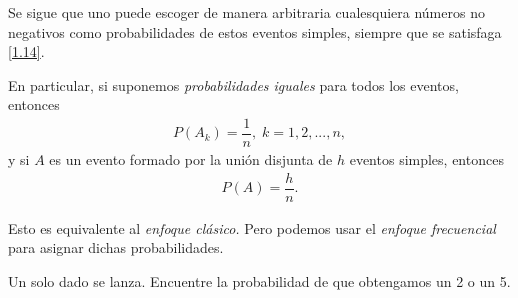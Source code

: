{}
Se sigue que uno puede escoger de manera arbitraria cualesquiera números no negativos como probabilidades de estos eventos simples, siempre que se satisfaga \eqref{1.14}. 

En particular, si suponemos \emph{probabilidades iguales} para todos los eventos, entonces
\begin{align}
 \label{1.15}
 P(A_{k})=\dfrac{1}{n}, \; k=1,2,...,n,
\end{align}
y si $A$ es un evento formado por la unión disjunta de $h$ eventos simples, entonces
\begin{align}
	\label{1.16}
 P(A)=\dfrac{h}{n}.
\end{align}


{}
\begin{rem}
 Esto es equivalente al \textit{enfoque clásico.} Pero podemos usar el \textit{enfoque frecuencial} para asignar dichas probabilidades.
\end{rem}


{}
\begin{exmp}
 \label{exmp:1.12}
 Un solo dado se lanza. Encuentre la probabilidad de que obtengamos un 2 o un 5.
\end{exmp}




